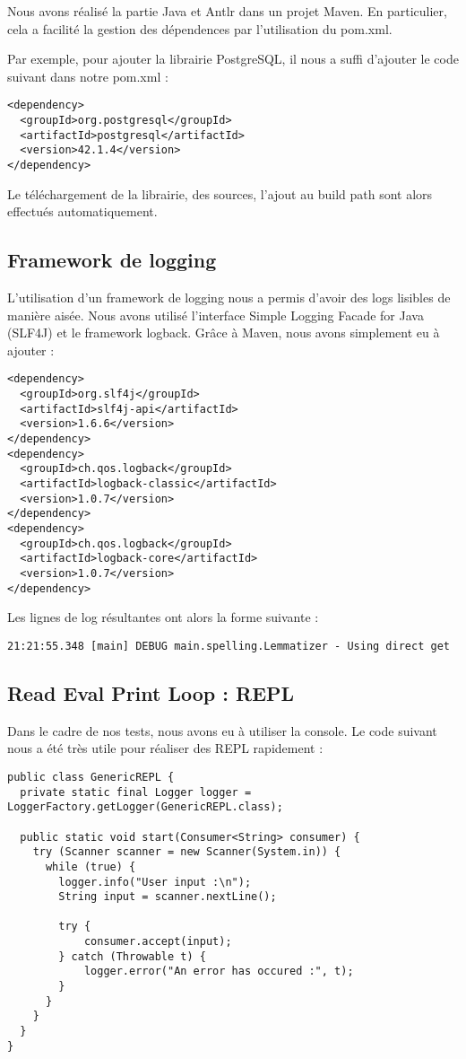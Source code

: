 \documentclass[a4paper]{elsarticle}
\begin{document}
Nous avons réalisé la partie Java et Antlr dans un projet Maven. En particulier, cela a facilité la gestion des dépendences par l'utilisation du pom.xml.

Par exemple, pour ajouter la librairie PostgreSQL, il nous a suffi d'ajouter le code suivant dans notre pom.xml :

\begin{lstlisting}[style=xml]
<dependency>
  <groupId>org.postgresql</groupId>
  <artifactId>postgresql</artifactId>
  <version>42.1.4</version>
</dependency>
\end{lstlisting}

Le téléchargement de la librairie, des sources, l'ajout au build path sont alors effectués automatiquement.

\subsection{Framework de logging}

L'utilisation d'un framework de logging nous a permis d'avoir des logs lisibles de manière aisée.
Nous avons utilisé l'interface Simple Logging Facade for Java (SLF4J) et le framework logback.
Grâce à Maven, nous avons simplement eu à ajouter :

\begin{lstlisting}[style=xml]
<dependency>
  <groupId>org.slf4j</groupId>
  <artifactId>slf4j-api</artifactId>
  <version>1.6.6</version>
</dependency>
<dependency>
  <groupId>ch.qos.logback</groupId>
  <artifactId>logback-classic</artifactId>
  <version>1.0.7</version>
</dependency>
<dependency>
  <groupId>ch.qos.logback</groupId>
  <artifactId>logback-core</artifactId>
  <version>1.0.7</version>
</dependency>
\end{lstlisting}

Les lignes de log résultantes ont alors la forme suivante :
\begin{verbatim}
21:21:55.348 [main] DEBUG main.spelling.Lemmatizer - Using direct get
\end{verbatim}

\subsection{Read Eval Print Loop : REPL}

Dans le cadre de nos tests, nous avons eu à utiliser la console. Le code suivant nous a été très utile pour réaliser des REPL rapidement :

\begin{lstlisting}
public class GenericREPL {
  private static final Logger logger = LoggerFactory.getLogger(GenericREPL.class);

  public static void start(Consumer<String> consumer) {
    try (Scanner scanner = new Scanner(System.in)) {
      while (true) {
        logger.info("User input :\n");
        String input = scanner.nextLine();

        try {
        	consumer.accept(input);
        } catch (Throwable t) {
        	logger.error("An error has occured :", t);
        }
      }
    }
  }
}
\end{lstlisting}
\end{document}
